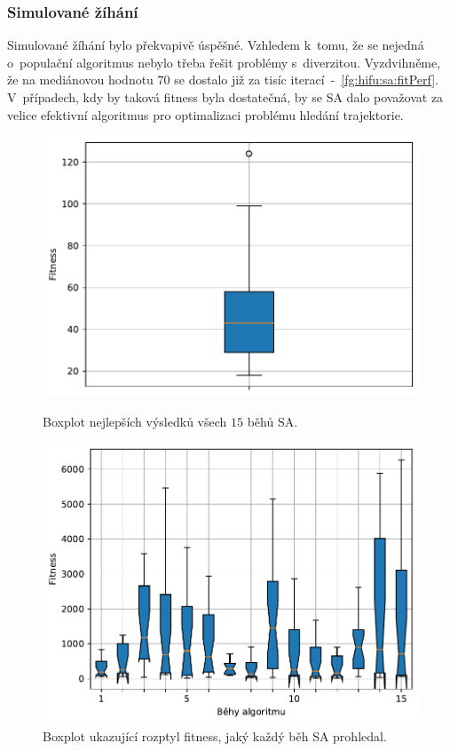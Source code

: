 \subsubsection{Simulované žíhání}
Simulované žíhání bylo překvapivě úspěšné. Vzhledem k~tomu, že se nejedná o~populační algoritmus nebylo třeba řešit problémy s~diverzitou. Vyzdvihněme, že na mediánovou hodnotu $70$ se dostalo již za tisíc iterací~-~\ref{fg:hifu:sa:fitPerf}. V~případech, kdy by taková fitness byla dostatečná, by se SA dalo považovat za velice efektivní algoritmus pro optimalizaci problému hledání trajektorie.
\begin{figure}[H]
\begin{minipage}[t]{0.475\linewidth}
\includegraphics[width=\linewidth]{obrazky-figures/statistics/HIFU/blob/4/SA/bestsBoxplot_WithOutliers.pdf}
\caption{Boxplot nejlepších výsledků všech $15$ běhů SA.}
\label{fg:hifu:sa:best}
\end{minipage}
\hfill
\begin{minipage}[t]{0.475\linewidth}
\includegraphics[width=\linewidth]{obrazky-figures/statistics/HIFU/blob/4/SA/lastGenBoxplots.pdf}
\caption{Boxplot ukazující rozptyl fitness, jaký každý běh SA prohledal.}
\label{fg:hifu:sa:lastGen}
\end{minipage}
\end{figure}

